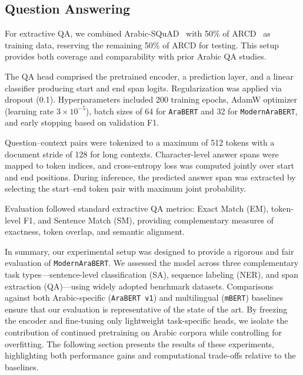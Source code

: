 \subsection{Question Answering}
For extractive QA, we combined Arabic-SQuAD~\cite{Mozannar:2019} with 50\% of ARCD~\cite{mozannar-etal-2019-neural} as training data, reserving the remaining 50\% of ARCD for testing. This setup provides both coverage and comparability with prior Arabic QA studies.  

The QA head comprised the pretrained encoder, a prediction layer, and a linear classifier producing start and end span logits. Regularization was applied via dropout (0.1). Hyperparameters included 200 training epochs, AdamW optimizer (learning rate $3\times10^{-5}$), batch sizes of 64 for \texttt{AraBERT} and 32 for \texttt{ModernAraBERT}, and early stopping based on validation F1.  

Question–context pairs were tokenized to a maximum of 512 tokens with a document stride of 128 for long contexts. Character-level answer spans were mapped to token indices, and cross-entropy loss was computed jointly over start and end positions. During inference, the predicted answer span was extracted by selecting the start–end token pair with maximum joint probability.  

Evaluation followed standard extractive QA metrics: Exact Match (EM), token-level F1, and Sentence Match (SM), providing complementary measures of exactness, token overlap, and semantic alignment.  


In summary, our experimental setup was designed to provide a rigorous and fair evaluation of \texttt{ModernAraBERT}. We assessed the model across three complementary task types—sentence-level classification (SA), sequence labeling (NER), and span extraction (QA)—using widely adopted benchmark datasets. Comparisons against both Arabic-specific (\texttt{AraBERT v1}) and multilingual (\texttt{mBERT}) baselines ensure that our evaluation is representative of the state of the art. By freezing the encoder and fine-tuning only lightweight task-specific heads, we isolate the contribution of continued pretraining on Arabic corpora while controlling for overfitting. The following section presents the results of these experiments, highlighting both performance gains and computational trade-offs relative to the baselines.

